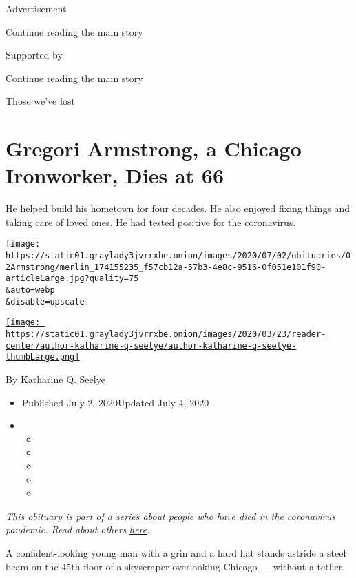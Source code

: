 Advertisement

\protect\hyperlink{after-top}{Continue reading the main story}

Supported by

\protect\hyperlink{after-sponsor}{Continue reading the main story}

Those we've lost

\hypertarget{gregori-armstrong-a-chicago-ironworker-dies-at-66}{%
\section{Gregori Armstrong, a Chicago Ironworker, Dies at
66}\label{gregori-armstrong-a-chicago-ironworker-dies-at-66}}

He helped build his hometown for four decades. He also enjoyed fixing
things and taking care of loved ones. He had tested positive for the
coronavirus.

\texttt{[image: https://static01.graylady3jvrrxbe.onion/images/2020/07/02/obituaries/02Armstrong/merlin\_174155235\_f57cb12a-57b3-4e8c-9516-0f051e101f90-articleLarge.jpg?quality=75\\\&auto=webp\\\&disable=upscale]}

\href{https://www.nytimes3xbfgragh.onion/by/katharine-q-seelye}{\texttt{[image: https://static01.graylady3jvrrxbe.onion/images/2020/03/23/reader-center/author-katharine-q-seelye/author-katharine-q-seelye-thumbLarge.png]}}

By
\href{https://www.nytimes3xbfgragh.onion/by/katharine-q-seelye}{Katharine
Q. Seelye}

\begin{itemize}
\item
  Published July 2, 2020Updated July 4, 2020
\item
  \begin{itemize}
  \item
  \item
  \item
  \item
  \item
  \end{itemize}
\end{itemize}

\emph{This obituary is part of a series about people who have died in
the coronavirus pandemic. Read about others}
\href{https://www.nytimes3xbfgragh.onion/interactive/2020/obituaries/people-died-coronavirus-obituaries.html}{\emph{here}}\emph{.}

A confident-looking young man with a grin and a hard hat stands astride
a steel beam on the 45th floor of a skyscraper overlooking Chicago ---
without a tether.

